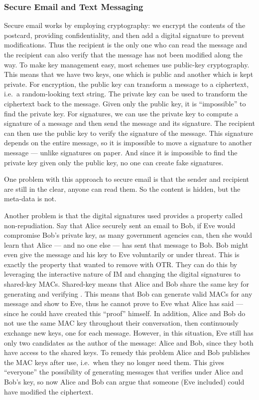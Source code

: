 \subsubsection{Secure Email and Text Messaging}

Secure email works by employing cryptography: we encrypt the contents of the 
postcard, providing confidentiality, and then add a digital signature to 
prevent modifications.
Thus the recipient is the only one who can read the message and the recipient 
can also verify that the message has not been modified along the way.
To make key management easy, most schemes use public-key cryptography.
This means that we have two keys, one which is public and another which is kept
private.
For encryption, the public key can transform a message to a ciphertext, i.e.\ 
a random-looking text string.
The private key can be used to transform the ciphertext back to the message.
Given only the public key, it is \enquote{impossible} to find the private key.
For signatures, we can use the private key to compute a signature of a message 
and then send the message and its signature.
The recipient can then use the public key to verify the signature of the 
message.
This signature depends on the entire message, so it is impossible to move 
a signature to another message --- unlike signatures on paper.
And since it is impossible to find the private key given only the public key, 
no one can create fake signatures.

One problem with this approach to secure email is that the sender and recipient
are still in the clear, anyone can read them.
So the content is hidden, but the meta-data is not.

Another problem is that the digital signatures used provides a property called 
non-repudiation.
Say that Alice securely sent an email to Bob, if Eve would compromise Bob's 
private key, as many government agencies can, then she would learn that Alice 
--- and no one else --- has sent that message to Bob.
Bob might even give the message and his key to Eve voluntarily or under threat.
This is exactly the property that \citeauthor{otr2004} wanted to remove with 
\ac{OTR}.
They can do this by leveraging the interactive nature of \ac{IM} and changing 
the digital signatures to shared-key \acp{MAC}.
Shared-key means that Alice and Bob share the same key for generating and 
verifying \iac{MAC}.
This means that Bob can generate valid \acp{MAC} for any message and show to 
Eve, thus he cannot prove to Eve what Alice has said --- since he could have 
created this \enquote{proof} himself.
In addition, Alice and Bob do not use the same \ac{MAC} key throughout their 
conversation, then continuously exchange new keys, one for each message.
However, in this situation, Eve still has only two candidates as the author of 
the message: Alice and Bob, since they both have access to the shared keys.
To remedy this problem Alice and Bob publishes the \ac{MAC} keys after use, 
i.e.\ when they no longer need them.
This gives \enquote{everyone} the possibility of generating messages that 
verifies under Alice and Bob's key, so now Alice and Bob can argue that someone 
(Eve included) could have modified the ciphertext.

